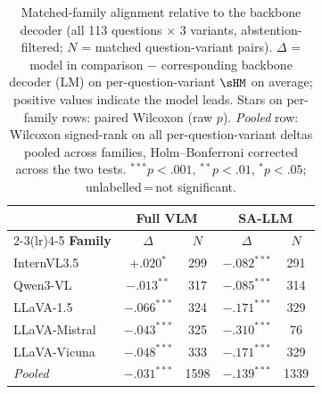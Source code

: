 \begin{table}[ht]
\centering\small\setlength{\tabcolsep}{5pt}
\begin{tabular}{l cc cc}
\toprule
& \multicolumn{2}{c}{\textbf{Full VLM}} & \multicolumn{2}{c}{\textbf{SA-LLM}} \\
\cmidrule(lr){2-3}\cmidrule(lr){4-5}
\textbf{Family} & $\Delta$ & $N$ & $\Delta$ & $N$ \\
\midrule
InternVL3.5 & $+.020^{*}$ & 299 & $-.082^{***}$ & 291 \\
Qwen3-VL & $-.013^{**}$ & 317 & $-.085^{***}$ & 314 \\
LLaVA-1.5 & $-.066^{***}$ & 324 & $-.171^{***}$ & 329 \\
LLaVA-Mistral & $-.043^{***}$ & 325 & $-.310^{***}$ & 76 \\
LLaVA-Vicuna & $-.048^{***}$ & 333 & $-.171^{***}$ & 329 \\
\midrule
\textit{Pooled} & $-.031^{***}$ & 1598 & $-.139^{***}$ & 1339 \\
\bottomrule
\end{tabular}
\caption{Matched-family alignment relative to the backbone decoder (all 113 questions $\times$ 3 variants, abstention-filtered; $N$ = matched question-variant pairs).
$\Delta$ = model in comparison $-$ corresponding backbone decoder (LM) on per-question-variant $\sHM$ on average; positive values indicate the model leads.
Stars on per-family rows: paired Wilcoxon (raw $p$). \textit{Pooled} row: Wilcoxon signed-rank on all per-question-variant deltas pooled across families, Holm--Bonferroni corrected across the two tests. ${}^{***}p{<}.001$, ${}^{**}p{<}.01$, ${}^{*}p{<}.05$; unlabelled\,=\,not significant.}
\label{tab:matched_family_alignment_tests_absf}
\end{table}